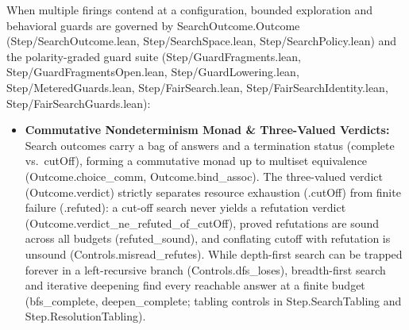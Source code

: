 \documentclass[11pt,a4paper]{article}
\theoremstyle{definition}
\DeclareRobustCommand{\lean}[1]{%
  \ifmmode\text{\normalfont\ttfamily\footnotesize\detokenize{#1}}%
  \else{\normalfont\footnotesize\leanurl{#1}}\fi}
\DeclareRobustCommand{\metta}[1]{\text{\normalfont\ttfamily\footnotesize #1}}
\def\lean#1{#1}%
\def\metta#1{#1}%
\begin{document}
When multiple firings contend at a configuration, bounded exploration and behavioral guards are governed by \lean{SearchOutcome.Outcome} (\lean{Step/SearchOutcome.lean}, \lean{Step/SearchSpace.lean}, \lean{Step/SearchPolicy.lean}) and the polarity-graded guard suite (\lean{Step/GuardFragments.lean}, \lean{Step/GuardFragmentsOpen.lean}, \lean{Step/GuardLowering.lean}, \lean{Step/MeteredGuards.lean}, \lean{Step/FairSearch.lean}, \lean{Step/FairSearchIdentity.lean}, \lean{Step/FairSearchGuards.lean}):
\begin{itemize}[leftmargin=1.8em, nosep]
  \item \textbf{Commutative Nondeterminism Monad \& Three-Valued Verdicts:} Search outcomes carry a bag of answers and a termination status (\metta{complete} vs.\ \metta{cutOff}), forming a commutative monad up to multiset equivalence (\lean{Outcome.choice_comm}, \lean{Outcome.bind_assoc}). The three-valued verdict (\lean{Outcome.verdict}) strictly separates resource exhaustion (\metta{.cutOff}) from finite failure (\metta{.refuted}): a cut-off search never yields a refutation verdict (\lean{Outcome.verdict_ne_refuted_of_cutOff}), proved refutations are sound across all budgets (\lean{refuted_sound}), and conflating cutoff with refutation is unsound (\lean{Controls.misread_refutes}). While depth-first search can be trapped forever in a left-recursive branch (\lean{Controls.dfs_loses}), breadth-first search and iterative deepening find every reachable answer at a finite budget (\lean{bfs_complete}, \lean{deepen_complete}; tabling controls in \lean{Step.SearchTabling} and \lean{Step.ResolutionTabling}).

\end{itemize}
\end{document}
